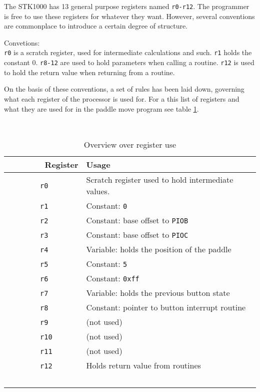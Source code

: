 The STK1000 has 13 general purpose registers named \texttt{r0-r12}. The programmer is free to use these registers for whatever they want.
However, several conventions are commonplace to introduce a certain degree of structure.

Convetions:\\
\texttt{r0} is a scratch register, used for intermediate calculations and such.
\texttt{r1} holds the constant 0.
\texttt{r8-12} are used to hold parameters when calling a routine.
\texttt{r12} is used to hold the return value when returning from a routine.

On the basis of these conventions, a set of rules has been laid down, governing what each register of the processor is used for.
For a this list of registers and what they are used for in the paddle move program see table \ref{register-table}.

\begin{table}
    \centering
    \begin{tabular}{|l|l|}
        \hline
        Register  & Usage \\
        \hline
        \hline
        \texttt{r0}  & Scratch register used to hold intermediate values. \\
        \hline
        \texttt{r1}  & Constant: \texttt{0} \\ 
        \hline
        \texttt{r2}  & Constant: base offset to \texttt{PIOB} \\ 
        \hline
        \texttt{r3}  & Constant: base offset to \texttt{PIOC} \\ 
        \hline
        \texttt{r4}  & Variable: holds the position of the paddle \\ 
        \hline
        \texttt{r5}  & Constant: \texttt{5} \\ 
        \hline
        \texttt{r6}  & Constant: \texttt{0xff} \\ 
        \hline
        \texttt{r7}  & Variable: holds the previous button state \\ 
        \hline
        \texttt{r8}  & Constant: pointer to button interrupt routine \\ 
        \hline
        \texttt{r9}  & (not used) \\ 
        \hline
        \texttt{r10} & (not used) \\ 
        \hline
        \texttt{r11} & (not used) \\ 
        \hline
        \texttt{r12} & Holds return value from routines \\
        \hline
    \end{tabular}
    \caption{Overview over register use}
    \label{register-table}
\end{table}
